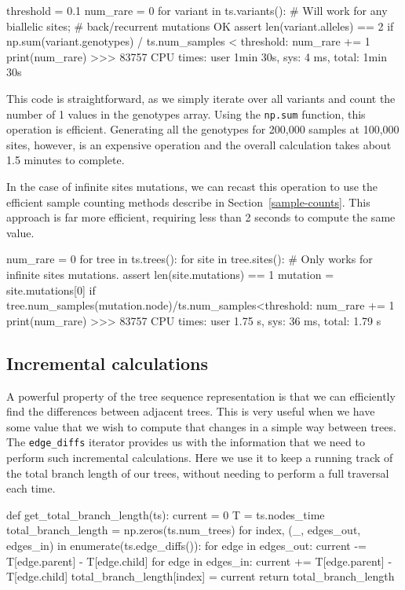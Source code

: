 \documentclass[graybox]{svmult}
\begin{document}
\begin{pythoncode}
threshold = 0.1
num_rare = 0
for variant in ts.variants():
    # Will work for any biallelic sites;
    # back/recurrent mutations OK
    assert len(variant.alleles) == 2
    if np.sum(variant.genotypes) / ts.num_samples < threshold:
        num_rare += 1
print(num_rare)
>>> 83757
CPU times: user 1min 30s, sys: 4 ms, total: 1min 30s
\end{pythoncode}

This code is straightforward, as we simply iterate over all variants and
count the number of 1 values in the genotypes array. Using the \texttt{np.sum}
function, this operation is efficient. Generating all the genotypes for
200,000 samples at 100,000 sites, however,
is an expensive operation and the overall calculation takes about 1.5 minutes
to complete.

In the case of infinite sites mutations, we can recast this operation
to use the efficient sample counting methods describe in
Section~\ref{sample-counts}. This approach is far more
efficient, requiring less than 2 seconds to compute the same value.
\begin{pythoncode}
num_rare = 0
for tree in ts.trees():
  for site in tree.sites():
    # Only works for infinite sites mutations.
    assert len(site.mutations) == 1
    mutation = site.mutations[0]
    if tree.num_samples(mutation.node)/ts.num_samples<threshold:
        num_rare += 1
print(num_rare)
>>> 83757
CPU times: user 1.75 s, sys: 36 ms, total: 1.79 s
\end{pythoncode}

\subsection{Incremental calculations}\label{incremental-calculations}

A powerful property of the tree sequence representation is that we can
efficiently find the differences between adjacent trees. This is very
useful when we have some value that we wish to compute that changes in a
simple way between trees. The \texttt{edge\_diffs} iterator provides us
with the information that we need to perform such incremental
calculations. Here we use it to keep a running track of the total branch
length of our trees, without needing to perform a full traversal each
time.

\begin{pythoncode}
def get_total_branch_length(ts):
    current = 0
    T = ts.nodes_time
    total_branch_length = np.zeros(ts.num_trees)
    for index, (_, edges_out, edges_in) in enumerate(ts.edge_diffs()):
        for edge in edges_out:
            current -= T[edge.parent] - T[edge.child]
        for edge in edges_in:
            current += T[edge.parent] - T[edge.child]
        total_branch_length[index] = current
    return total_branch_length
\end{pythoncode}
\end{document}
